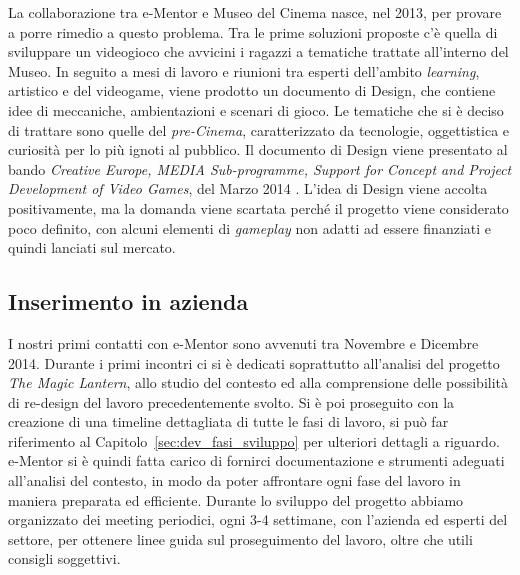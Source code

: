 La collaborazione tra e-Mentor e Museo del Cinema nasce, nel 2013, per provare a porre rimedio a questo problema.
Tra le prime soluzioni proposte c’è quella di sviluppare un videogioco che avvicini i ragazzi a tematiche trattate all’interno del Museo. In seguito a mesi di lavoro e riunioni tra esperti dell’ambito \textit{learning}, artistico e del videogame, viene prodotto un documento di Design, che contiene idee di meccaniche, ambientazioni e scenari di gioco. Le tematiche che si è deciso di trattare sono quelle del \textit{pre-Cinema}, caratterizzato da tecnologie, oggettistica e curiosità per lo più ignoti al pubblico.
Il documento di Design viene presentato al bando \textit{Creative Europe, MEDIA Sub-programme, Support for Concept and Project Development of Video Games}, del Marzo 2014 \cite{CreativeEurope}.
L’idea di Design viene accolta positivamente, ma la domanda viene scartata perché il progetto viene considerato poco definito, con alcuni elementi di \textit{gameplay} non adatti ad essere finanziati e quindi lanciati sul mercato.

\subsection{Inserimento in azienda}
\label{sec:azienda_inserimento}

I nostri primi contatti con e-Mentor sono avvenuti tra Novembre e Dicembre 2014. Durante i primi incontri ci si è dedicati soprattutto all'analisi del progetto \textit{The Magic Lantern}, allo studio del contesto ed alla comprensione delle possibilità di re-design del lavoro precedentemente svolto.
Si è poi proseguito con la creazione di una timeline dettagliata di tutte le fasi di lavoro, si può far riferimento al Capitolo~\ref{sec:dev_fasi_sviluppo} per ulteriori dettagli a riguardo.
e-Mentor si è quindi fatta carico di fornirci documentazione e strumenti adeguati all'analisi del contesto, in modo da poter affrontare ogni fase del lavoro in maniera preparata ed efficiente.
Durante lo sviluppo del progetto abbiamo organizzato dei meeting periodici, ogni 3-4 settimane, con l'azienda ed esperti del settore, per ottenere linee guida sul proseguimento del lavoro, oltre che utili consigli soggettivi.
